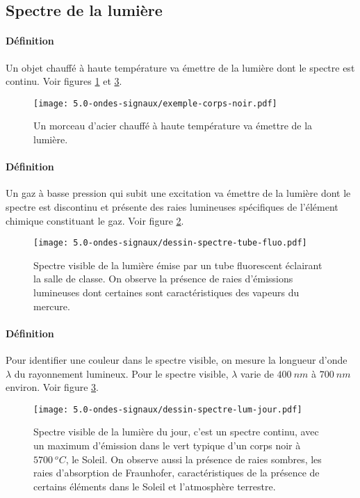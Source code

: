 \subsection{Spectre de la lumière}
\paragraph{Définition} Un objet chauffé à haute température va émettre de la lumière dont le spectre est continu. Voir figures \ref{fig:exemple-corps-noir}  et \ref{fig:dessin-spectre-lum-jour}.
\begin{figure}[h!]
  \begin{center}
      \texttt{[image: 5.0-ondes-signaux/exemple-corps-noir.pdf]}
  \end{center}
  \caption{Un morceau d'acier chauffé à haute température va émettre de la lumière.}
  \label{fig:exemple-corps-noir}
\end{figure}
\paragraph{Définition} Un gaz à basse pression qui subit une excitation va émettre de la lumière dont le spectre est discontinu et présente des raies lumineuses spécifiques de l'élément chimique constituant le gaz. Voir figure \ref{fig:dessin-spectre-tube-fluo}.
\begin{figure}[h!]
  \begin{center}
      \texttt{[image: 5.0-ondes-signaux/dessin-spectre-tube-fluo.pdf]}
  \end{center}
  \caption{Spectre visible de la lumière émise par un tube fluorescent éclairant la salle de classe. On observe la présence de raies d'émissions lumineuses dont certaines sont caractéristiques des vapeurs du mercure.}
  \label{fig:dessin-spectre-tube-fluo}
\end{figure}
\paragraph{Définition} Pour identifier une couleur dans le spectre visible, on mesure la longueur d'onde $\lambda$ du rayonnement lumineux. Pour le spectre visible, $\lambda$ varie de $400~nm$ à $700~nm$ environ. Voir figure \ref{fig:dessin-spectre-lum-jour}.
\begin{figure}[h!]
  \begin{center}
      \texttt{[image: 5.0-ondes-signaux/dessin-spectre-lum-jour.pdf]}
  \end{center}
  \caption{Spectre visible de la lumière du jour, c'est un spectre continu, avec un maximum d'émission dans le vert typique d'un corps noir à $5700~{}^oC$, le Soleil. On observe aussi la présence de raies sombres, les raies d’absorption de Fraunhofer, caractéristiques de la présence de certains éléments dans le Soleil et l'atmosphère terrestre.}
  \label{fig:dessin-spectre-lum-jour}
\end{figure}

